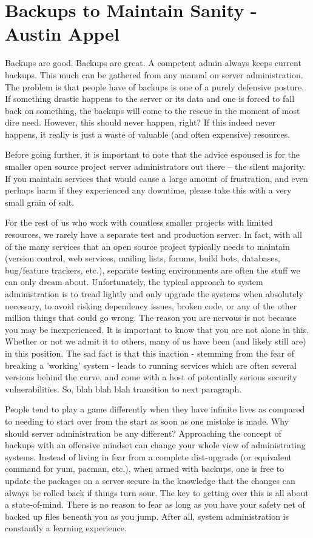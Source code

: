 \chapter{Backups to Maintain Sanity - Austin Appel}

Backups are good. Backups are great. A competent admin always keeps current backups.  This much can be gathered from any manual on server administration. The problem is that people have of backups is one of a purely defensive posture. If something drastic happens to the server or its data and one is forced to fall back on something, the backups will come to the rescue in the moment of most dire need. However, this should never happen, right?  If this indeed never happens, it really is just a waste of valuable (and often expensive) resources.

Before going further, it is important to note that the advice espoused is for the smaller open source project server administrators out there – the silent majority. If you maintain services that would cause a large amount of frustration, and even perhaps harm if they experienced any downtime, please take this with a very small grain of salt.

For the rest of us who work with countless smaller projects with limited resources, we rarely have a separate test and production server. In fact, with all of the many services that an open source project typically needs to maintain (version control, web services, mailing lists, forums, build bots, databases, bug/feature trackers, etc.), separate testing environments are often the stuff we can only dream about. Unfortunately, the typical approach to system administration is to tread lightly and only upgrade the systems when absolutely necessary, to avoid risking dependency issues, broken code, or any of the other million things that could go wrong. The reason you are nervous is not because you may be inexperienced. It is important to know that you are not alone in this. Whether or not we admit it to others, many of us have been (and likely still are) in this position. The sad fact is that this inaction - stemming from the fear of breaking a 'working' system - leads to running services which are often several versions behind the curve, and come with a host of potentially serious security vulnerabilities. So, blah blah blah transition to next paragraph.

People tend to play a game differently when they have infinite lives as compared to needing to start over from the start as soon as one mistake is made. Why should server administration be any different? Approaching the concept of backups with an offensive mindset can change your whole view of administrating systems. Instead of living in fear from a complete dist-upgrade (or equivalent command for yum, pacman, etc.), when armed with backups, one is free to update the packages on a server secure in the knowledge that the changes can always be rolled back if things turn sour. The key to getting over this is all about a state-of-mind. There is no reason to fear as long as you have your safety net of backed up files beneath you as you jump. After all, system administration is constantly a learning experience.

